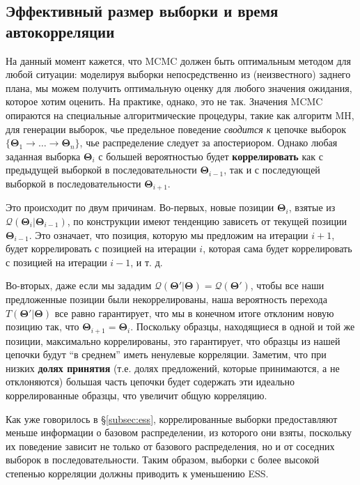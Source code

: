 \documentclass[12pt, titlepage]{article}
\newcommand{\params}{\ensuremath{\boldsymbol\Theta}}
\newcommand{\proposal}{\ensuremath{\mathcal{Q}}}
\begin{document}
\subsection{Эффективный размер выборки и время автокорреляции} \label{subsec:autocorr}

На данный момент кажется, что MCMC должен быть оптимальным методом для любой ситуации: моделируя выборки непосредственно из (неизвестного) заднего плана, мы можем получить оптимальную оценку для любого значения ожидания, которое хотим оценить. На практике, однако, это не так. Значения MCMC опираются на специальные алгоритмические процедуры, такие как алгоритм MH, для генерации выборок, чье предельное поведение \textit{ сводится к} цепочке выборок $\{ \params_1 \rightarrow \dots \rightarrow \params_n \}$, чье распределение следует за апостериором. Однако любая заданная выборка $\params_i$ с большей вероятностью будет \textbf{коррелировать} как с предыдущей выборкой в последовательности $\params_{i-1}$, так и с последующей выборкой в последовательности $\params_{i+1}$.

Это происходит по двум причинам. Во-первых, новые позиции $\params_i$, взятые из $\proposal(\params_i|\params_{i-1})$, по конструкции имеют тенденцию зависеть от текущей позиции $\params_{i-1}$. Это означает, что позиция, которую мы предложим на итерации $i+1$, будет коррелировать с позицией на итерации $i$, которая сама будет коррелировать с позицией на итерации $i-1$, и т. д. 

Во-вторых, даже если мы зададим $\proposal(\params'|\params)=\proposal(\params')$, чтобы все наши предложенные позиции были некоррелированы, наша вероятность перехода $T(\params'|\params)$ все равно гарантирует, что мы в конечном итоге отклоним новую позицию так, что $\params_{i+1}=\params_{i}$. Поскольку образцы, находящиеся в одной и той же позиции, максимально коррелированы, это гарантирует, что образцы из нашей цепочки будут ``в среднем'' иметь ненулевые корреляции. Заметим, что при низких \textbf{долях принятия} (т.е. долях предложений, которые принимаются, а не отклоняются) большая часть цепочки будет содержать эти идеально коррелированные образцы, что увеличит общую корреляцию.

Как уже говорилось в \S\ref{subsec:ess}, коррелированные выборки предоставляют меньше информации о базовом распределении, из которого они взяты, поскольку их поведение зависит не только от базового распределения, но и от соседних выборок в последовательности. Таким образом, выборки с более высокой степенью корреляции должны приводить к уменьшению ESS.
\end{document}
